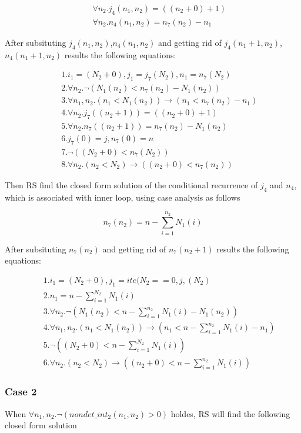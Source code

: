 \begin{eqnarray*}
	&&\forall n_2.j_4(n_1,n_2) = ((n_2+0)+1)\\  
	&&\forall n_2.n_4(n_1,n_2) = n_7(n_2)-n_1 
\end{eqnarray*}

After subsituting $j_4(n_1,n_2)$,$n_4(n_1,n_2)$ and getting rid of $j_4(n_1+1,n_2)$,$n_4(n_1+1,n_2)$ results the following equations:

\begin{eqnarray*}
	&&1.i_1 = (N_2+0), j_1 = j_7(N_2), n_1 = n_7(N_2)\\
	&&2.\forall n_2.\neg (N_1(n_2)<n_7(n_2)-N_1(n_2))\\
	&&3.\forall n_1,n_2.(n_1<N_1(n_2)) \rightarrow (n_1<n_7(n_2)-n_1)\\
	&&4.\forall n_2.j_7((n_2+1)) = ((n_2+0)+1)\\
	&&5.\forall n_2.n_7((n_2+1)) = n_7(n_2)-N_1(n_2)\\
	&&6.j_7(0) = j, n_7(0) = n\\
	&&7.\neg ((N_2+0)<n_7(N_2))\\
	&&8.\forall n_2.(n_2<N_2) \rightarrow ((n_2+0)<n_7(n_2))
\end{eqnarray*}



Then RS find the closed form solution of the conditional recurrence of $j_4$ and $n_4$, which is associated  with inner loop, using case analysis as follows

\[n_7(n_2) = n-\sum_{i=1}^{n_2}N_1(i)\]

After subsituting $n_7(n_2)$ and getting rid of $n_7(n_2+1)$ results the following equations:

\begin{eqnarray*}
	&&1.i_1 = (N_2+0), j_1 = ite(N_2==0,j,(N_2)\\
	&&2.n_1 = n-\sum_{i=1}^{N_2}N_1(i)\\
	&&3.\forall n_2.\neg (N_1(n_2)<n-\sum_{i=1}^{n_2}N_1(i)-N_1(n_2))\\
    &&4.\forall n_1,n_2.(n_1<N_1(n_2)) \rightarrow (n_1<n-\sum_{i=1}^{n_2}N_1(i)-n_1)\\
	&&5.\neg ((N_2+0)<n-\sum_{i=1}^{N_2}N_1(i))\\
	&&6.\forall n_2.(n_2<N_2) \rightarrow ((n_2+0)<n-\sum_{i=1}^{n_2}N_1(i))
\end{eqnarray*}

\subsubsection{Case 2} When $\forall n_1,n_2.\neg (nondet\_int_2(n_1,n_2)>0)$ holdes, RS will find the following closed form solution

